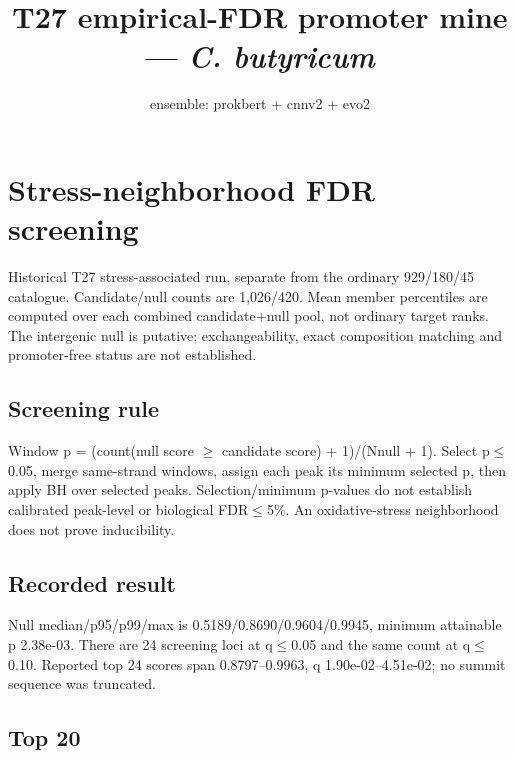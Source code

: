 \documentclass{article}
\title{T27 empirical-FDR promoter mine --- \textit{C. butyricum}}
\date{ensemble: prokbert + cnnv2 + evo2}
\begin{document}
\maketitle
\section{Stress-neighborhood FDR screening}\label{stress-neighborhood-fdr-screening}

Historical T27 stress-associated run, separate from the ordinary 929/180/45 catalogue. Candidate/null counts are 1,026/420. Mean member percentiles are computed over each combined candidate+null pool, not ordinary target ranks. The intergenic null is putative; exchangeability, exact composition matching and promoter-free status are not established.

\subsection{Screening rule}\label{screening-rule}

Window p = (count(null score \ensuremath{\geq} candidate score) + 1)/(Nnull + 1). Select p\ensuremath{\leq}0.05, merge same-strand windows, assign each peak its minimum selected p, then apply BH over selected peaks. Selection/minimum p-values do not establish calibrated peak-level or biological FDR\ensuremath{\leq}5\%. An oxidative-stress neighborhood does not prove inducibility.

\subsection{Recorded result}\label{recorded-result}

Null median/p95/p99/max is 0.5189/0.8690/0.9604/0.9945, minimum attainable p 2.38e-03. There are 24 screening loci at q\ensuremath{\leq}0.05 and the same count at q\ensuremath{\leq}0.10. Reported top 24 scores span 0.8797--0.9963, q 1.90e-02--4.51e-02; no summit sequence was truncated.

\subsection{Top 20}\label{top-20}
\end{document}
